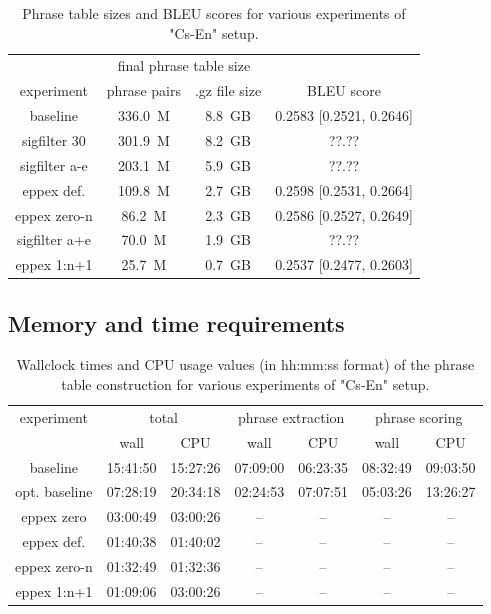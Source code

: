 \begin{table}[ht]
\centering
\begin{tabular}{ | c | c c | c | }
\hline
 & \multicolumn{2}{|c|}{final phrase table size} & \\
experiment & phrase pairs & .gz file size & BLEU score \\
\hline
\hline
baseline        & 336.0~M & 8.8~GB & 0.2583 [0.2521, 0.2646] \\
sigfilter 30    & 301.9~M & 8.2~GB & ??.?? \\ %
sigfilter a-e   & 203.1~M & 5.9~GB & ??.?? \\ %
eppex def.      & 109.8~M & 2.7~GB & 0.2598 [0.2531, 0.2664] \\
eppex zero-n    &  86.2~M & 2.3~GB & 0.2586 [0.2527, 0.2649] \\
sigfilter a+e   &  70.0~M & 1.9~GB & ??.?? \\ %
eppex 1:n+1     &  25.7~M & 0.7~GB & 0.2537 [0.2477, 0.2603] \\
\hline
\end{tabular}
\caption{\label{cs-en-wmt13-pt-size-and-bleu}Phrase table sizes and BLEU scores
for various experiments of "Cs-En" setup.}
\end{table}

\subsection{Memory and time requirements}

\begin{table}[ht]
\centering
\begin{tabular}{ | c | c c | c c | c c | }
\hline
experiment & \multicolumn{2}{|c|}{total} & \multicolumn{2}{|c|}{phrase extraction} & \multicolumn{2}{|c|}{phrase scoring} \\
 & wall & CPU & wall & CPU & wall & CPU \\
\hline
\hline
baseline      & 15:41:50 & 15:27:26 & 07:09:00 & 06:23:35 & 08:32:49 & 09:03:50 \\
opt. baseline & 07:28:19 & 20:34:18 & 02:24:53 & 07:07:51 & 05:03:26 & 13:26:27 \\
eppex zero    & 03:00:49 & 03:00:26 & -- & -- & -- & -- \\
\hline
eppex def.    & 01:40:38 & 01:40:02 & -- & -- & -- & -- \\
eppex zero-n  & 01:32:49 & 01:32:36 & -- & -- & -- & -- \\
eppex 1:n+1   & 01:09:06 & 03:00:26 & -- & -- & -- & -- \\
\hline
\end{tabular}
\caption{\label{cs-en-wmt13-time-benchmarks}Wallclock times and CPU usage values
(in hh:mm:ss format) of the phrase table construction for various experiments
of "Cs-En" setup.}
\end{table}


